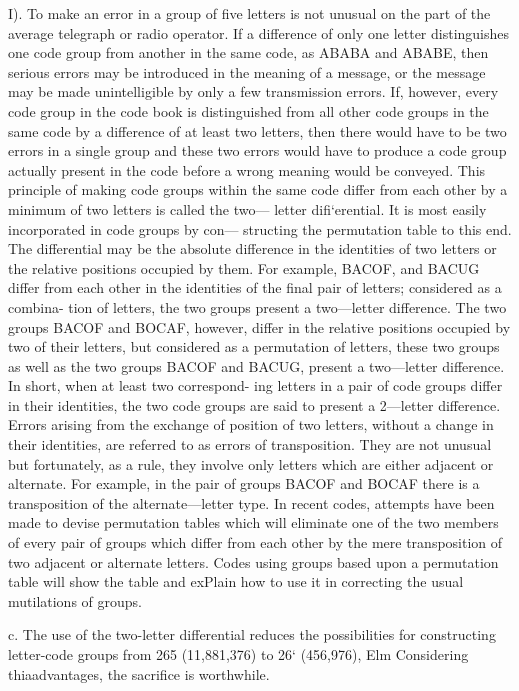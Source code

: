 I). To make an error in a group of ﬁve letters is not unusual on the
part of the average telegraph or radio operator. If a difference of only
one letter distinguishes one code group from another in the same code,
as ABABA and ABABE, then serious errors may be introduced in the
meaning of a message, or the message may be made unintelligible by only
a few transmission errors. If, however, every code group in the code
book is distinguished from all other code groups in the same code by a
difference of at least two letters, then there would have to be two errors
in a single group and these two errors would have to produce a code
group actually present in the code before a wrong meaning would be
conveyed. This principle of making code groups within the same code
differ from each other by a minimum of two letters is called the two—
letter diﬁ‘erential. It is most easily incorporated in code groups by con—
structing the permutation table to this end. The differential may be the
absolute difference in the identities of two letters or the relative positions
occupied by them. For example, BACOF, and BACUG differ from each
other in the identities of the ﬁnal pair of letters; considered as a combina-
tion of letters, the two groups present a two—letter difference. The two
groups BACOF and BOCAF, however, differ in the relative positions
occupied by two of their letters, but considered as a permutation of
letters, these two groups as well as the two groups BACOF and BACUG,
present a two—letter difference. In short, when at least two correspond-
ing letters in a pair of code groups differ in their identities, the two code
groups are said to present a 2—letter difference. Errors arising from the
exchange of position of two letters, without a change in their identities,
are referred to as errors of transposition. They are not unusual but
fortunately, as a rule, they involve only letters which are either adjacent
or alternate. For example, in the pair of groups BACOF and BOCAF
there is a transposition of the alternate—letter type. In recent codes,
attempts have been made to devise permutation tables which will eliminate
one of the two members of every pair of groups which differ from each
other by the mere transposition of two adjacent or alternate letters. Codes
using groups based upon a permutation table will show the table and
exPlain how to use it in correcting the usual mutilations of groups.

c. The use of the two-letter differential reduces the possibilities for
constructing letter-code groups from 265 (11,881,376) to 26‘ (456,976),
Elm Considering thiaadvantages, the sacriﬁce is worthwhile.

